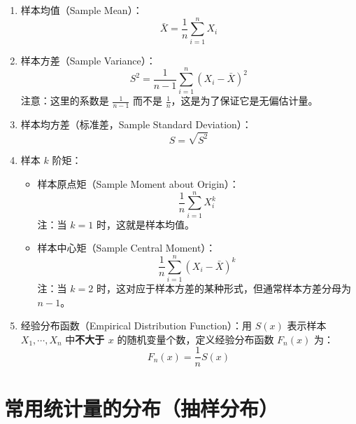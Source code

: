 \begin{property}[几个常用的统计量]
\begin{enumerate}
	\item 样本均值（Sample Mean）：
	\begin{equation}
		\bar{X} = \frac{1}{n} \sum_{i=1}^{n} X_i
		\label{eq:基本概念:样本均值}
	\end{equation}
	\item 样本方差（Sample Variance）：
	\begin{equation}
		S^2 = \frac{1}{n-1} \sum_{i=1}^{n} (X_i - \bar{X})^2
		\label{eq:基本概念:样本方差}
	\end{equation}
	注意：这里的系数是 $\frac{1}{n-1}$ 而不是 $\frac{1}{n}$，这是为了保证它是无偏估计量。
	\item 样本均方差（标准差，Sample Standard Deviation）：
	\begin{equation}
		S = \sqrt{S^2}
		\label{eq:基本概念:样本标准差}
	\end{equation}
	\item 样本 $k$ 阶矩：
	\begin{itemize}
		\item 样本原点矩（Sample Moment about Origin）：
		\begin{equation}
			\frac{1}{n} \sum_{i=1}^{n} X_i^k
			\label{eq:基本概念:原点矩}
		\end{equation}
		注：当 $k=1$ 时，这就是样本均值。
		\item 样本中心矩（Sample Central Moment）：
		\begin{equation}
			\frac{1}{n} \sum_{i=1}^{n} (X_i - \bar{X})^k
			\label{eq:基本概念:中心矩}
		\end{equation}
		注：当 $k=2$ 时，这对应于样本方差的某种形式，但通常样本方差分母为 $n-1$。
	\end{itemize}
	\item 经验分布函数（Empirical Distribution Function）：用 $S(x)$ 表示样本 $X_1, \cdots, X_n$ 中\textbf{不大于 $x$} 的随机变量个数，定义经验分布函数 $F_n(x)$ 为：
	\begin{equation}
		F_n(x) = \frac{1}{n} S(x)
		\label{eq:基本概念:经验分布函数}
	\end{equation}
\end{enumerate}
\end{property}

\section{常用统计量的分布（抽样分布）}
